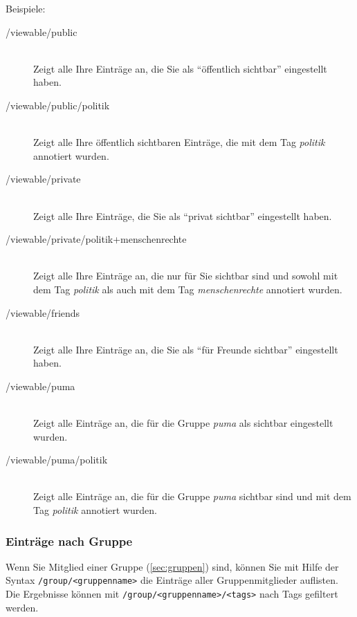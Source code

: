 Beispiele:
\begin{description}
    \item [/viewable/public] \hfill \\
    Zeigt alle Ihre Einträge an, die Sie als \enquote{öffentlich sichtbar} eingestellt haben.
    \item [/viewable/public/politik] \hfill \\
    Zeigt alle Ihre öffentlich sichtbaren Einträge, die mit dem Tag \textit{politik} annotiert wurden.
    \item [/viewable/private] \hfill \\
    Zeigt alle Ihre Einträge, die Sie als \enquote{privat sichtbar} eingestellt haben.
    \item [/viewable/private/politik+menschenrechte] \hfill \\
    Zeigt alle Ihre Einträge an, die nur für Sie sichtbar sind und sowohl mit dem Tag \textit{politik} als auch mit dem Tag \textit{menschenrechte} annotiert wurden. 
    \item [/viewable/friends] \hfill \\
    Zeigt alle Ihre Einträge an, die Sie als \enquote{für Freunde sichtbar} eingestellt haben.
    \item [/viewable/puma] \hfill \\
    Zeigt alle Einträge an, die für die Gruppe \textit{puma} als sichtbar eingestellt wurden.
    \item [/viewable/puma/politik] \hfill \\
    Zeigt alle Einträge an, die für die Gruppe \textit{puma} sichtbar sind und mit dem Tag \textit{politik} annotiert wurden.
\end{description}

\subsubsection*{Einträge nach Gruppe}
\label{sss:nachGruppe}
Wenn Sie Mitglied einer Gruppe (\autoref{sec:gruppen}) sind, können Sie mit Hilfe der Syntax \texttt{/group/<gruppenname>} die Einträge aller Gruppenmitglieder auflisten. Die Ergebnisse können mit \texttt{/group/<gruppenname>/<tags>} nach Tags gefiltert werden.

